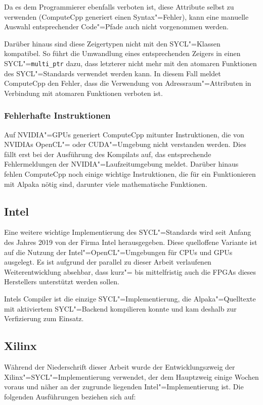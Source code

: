 Da es dem Programmierer ebenfalls verboten ist, diese Attribute selbst zu
verwenden (ComputeCpp generiert einen Syntax"=Fehler), kann eine manuelle
Auswahl entsprechender Code"=Pfade auch nicht vorgenommen werden.

Darüber hinaus sind diese Zeigertypen nicht mit den SYCL"=Klassen kompatibel.
So führt die Umwandlung eines entsprechenden Zeigers in einen
SYCL"=\texttt{multi\_ptr} dazu, dass letzterer nicht mehr mit den atomaren
Funktionen des SYCL"=Standards verwendet werden kann. In diesem Fall meldet
ComputeCpp den Fehler, dass die Verwendung von Adressraum"=Attributen in
Verbindung mit atomaren Funktionen verboten ist.

\subsubsection{Fehlerhafte Instruktionen}

Auf NVIDIA"=GPUs generiert ComputeCpp mitunter Instruktionen, die von NVIDIAs
OpenCL"= oder CUDA"=Umgebung nicht verstanden werden. Dies fällt erst bei der
Ausführung des Kompilats auf, das entsprechende Fehlermeldungen der
NVIDIA"=Laufzeitumgebung meldet. Darüber hinaus fehlen ComputeCpp noch einige
wichtige Instruktionen, die für ein Funktionieren mit Alpaka nötig sind,
darunter viele mathematische Funktionen.

\subsection{Intel}

Eine weitere wichtige Implementierung des SYCL"=Standards wird seit Anfang des
Jahres 2019 von der Firma Intel herausgegeben. Diese quelloffene Variante ist
auf die Nutzung der Intel"=OpenCL"=Umgebungen für CPUs und GPUs ausgelegt. Es
ist aufgrund der parallel zu dieser Arbeit verlaufenen Weiterentwicklung
absehbar, dass kurz"= bis mittelfristig auch die FPGAs dieses Herstellers
unterstützt werden sollen.

Intels Compiler ist die einzige SYCL"=Implementierung, die Alpaka"=Quelltexte
mit aktiviertem SYCL"=Backend kompilieren konnte und kam deshalb zur
Verfizierung zum Einsatz.

\subsection{Xilinx}

Während der Niederschrift dieser Arbeit wurde der Entwicklungszweig der
Xilinx"=SYCL"=Implementierung verwendet, der dem Hauptzweig einige Wochen voraus
und näher an der zugrunde liegenden Intel"=Implementierung ist. Die folgenden
Ausführungen beziehen sich auf:

